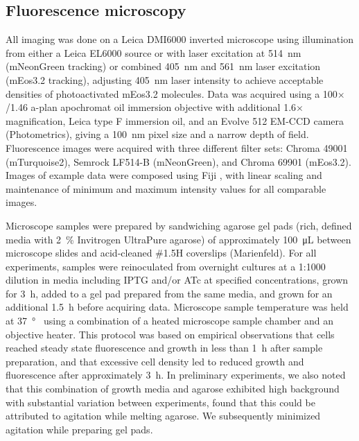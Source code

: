 \documentclass[twocolumn,pdflatex,sn-nature]{sn-jnl}%
\begin{document}
\subsection{Fluorescence microscopy}

All imaging was done on a Leica DMI6000 inverted microscope using illumination from either a Leica EL6000 source or with laser excitation at \qty{514}{\nm} (mNeonGreen tracking) or combined \qty{405}{\nm} and \qty{561}{\nm} laser excitation (mEos3.2 tracking), adjusting \qty{405}{\nm} laser intensity to achieve acceptable densities of photoactivated mEos3.2 molecules.
Data was acquired using a 100$\times$/1.46 a-plan apochromat oil immersion objective with additional 1.6$\times$ magnification, Leica type F immersion oil, and an Evolve 512 EM-CCD camera (Photometrics), giving a \qty{100}{\nm} pixel size and a narrow depth of field.
Fluorescence images were acquired with three different filter sets: Chroma 49001 (mTurquoise2), Semrock LF514-B (mNeonGreen), and Chroma 69901 (mEos3.2).
Images of example data were composed using Fiji \citep{schindelinFijiOpensourcePlatform2012}, with linear scaling and maintenance of minimum and maximum intensity values for all comparable images.

Microscope samples were prepared by sandwiching agarose gel pads (rich, defined media with \qty{2}{\percent} Invitrogen UltraPure agarose) of approximately \qty{100}{\uL} between microscope slides and acid-cleaned \#1.5H coverslips (Marienfeld).
For all experiments, samples were reinoculated from overnight cultures at a 1:1000 dilution in media including IPTG and/or ATc at specified concentrations, grown for \qty{3}{\hour}, added to a gel pad prepared from the same media, and grown for an additional \qty{1.5}{\hour} before acquiring data.
Microscope sample temperature was held at \qty{37}{\degree\C} using a combination of a heated microscope sample chamber and an objective heater.
This protocol was based on empirical observations that cells reached steady state fluorescence and growth in less than \qty{1}{\hour} after sample preparation, and that excessive cell density led to reduced growth and fluorescence after approximately \qty{3}{\hour}.
In preliminary experiments, we also noted that this combination of growth media and agarose exhibited high background with substantial variation between experiments, found that this could be attributed to agitation while melting agarose.
We subsequently minimized agitation while preparing gel pads.
\end{document}
